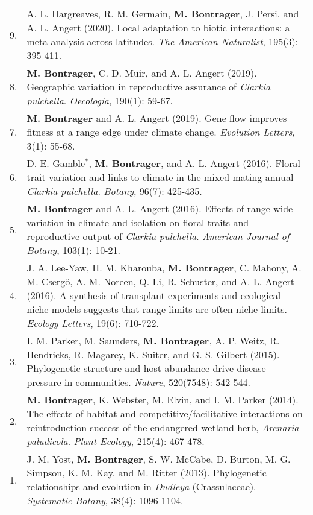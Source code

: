 \documentclass[letterpaper,11pt,oneside]{article}
\begin{document}
\noindent \begin{tabular}{@{} p{0.5cm} >{\raggedright\arraybackslash}p{16.7cm}}
9. & A. L. Hargreaves, R. M. Germain, \textbf{M. Bontrager}, J. Persi, and A. L. Angert (2020). Local adaptation to biotic interactions: a meta-analysis across latitudes. \textit{The American Naturalist}, 195(3): 395-411. \\
8. & \textbf{M. Bontrager}, C. D. Muir, and A. L. Angert (2019). Geographic variation in reproductive assurance of \textit{Clarkia pulchella}. \textit{Oecologia}, 190(1): 59-67. \\
7. & \textbf{M. Bontrager} and A. L. Angert (2019). Gene flow improves fitness at a range edge under climate change. \textit{Evolution Letters}, 3(1): 55-68. \\
6. & D. E. Gamble$^{*}$, \textbf{M. Bontrager}, and A. L. Angert (2016). Floral trait variation and links to climate in the mixed-mating annual \textit{Clarkia pulchella}. \textit{Botany}, 96(7): 425-435. \\
5. & \textbf{M. Bontrager} and A. L. Angert (2016). Effects of range-wide variation in climate and isolation on floral traits and reproductive output of \textit{Clarkia pulchella}. \textit{American Journal of Botany}, 103(1): 10-21.  \\
4. & J. A. Lee-Yaw, H. M. Kharouba, \textbf{M. Bontrager}, C. Mahony, A. M. Cserg{\H{o}}, A. M. Noreen, Q. Li, R. Schuster, and A. L. Angert (2016). A synthesis of transplant experiments and ecological niche models suggests that range limits are often niche limits. \textit{Ecology Letters}, 19(6): 710-722. \\
3. & I. M. Parker, M. Saunders, \textbf{M. Bontrager}, A. P. Weitz, R. Hendricks, R. Magarey, K. Suiter, and G. S. Gilbert (2015). Phylogenetic structure and host abundance drive disease pressure in communities. \textit{Nature}, 520(7548): 542-544. \\
2. & \textbf{M. Bontrager}, K. Webster, M. Elvin, and I. M. Parker (2014). The effects of habitat and competitive/facilitative interactions on reintroduction success of the endangered wetland herb, \textit{Arenaria paludicola}. \textit{Plant Ecology}, 215(4): 467-478. \\
1. & J. M. Yost, \textbf{M. Bontrager}, S. W. McCabe, D. Burton, M. G. Simpson, K. M. Kay, and M. Ritter (2013). Phylogenetic relationships and evolution in \textit{Dudleya} (Crassulaceae). \textit{Systematic Botany}, 38(4): 1096-1104. \\
\end{tabular}
\end{document}
